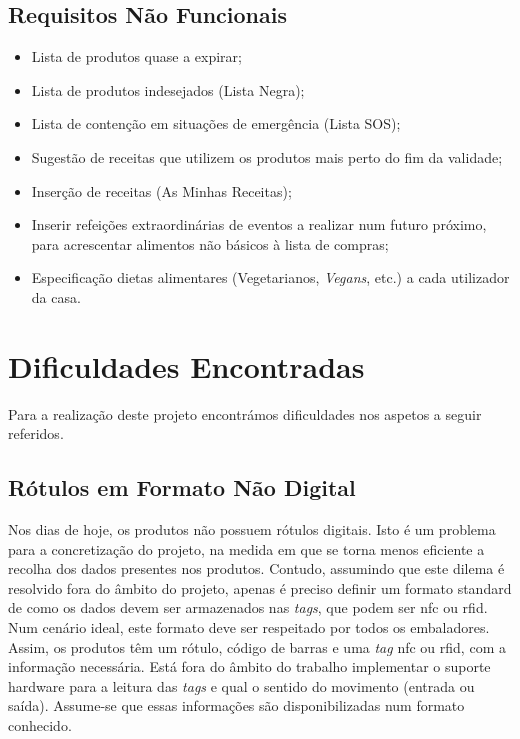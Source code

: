 \subsection{Requisitos Não Funcionais}
\begin{itemize}
	\item Lista de produtos quase a expirar;
	\item Lista de produtos indesejados (Lista Negra);
	\item Lista de contenção em situações de emergência (Lista SOS);
	\item Sugestão de receitas que utilizem os produtos mais perto do fim da validade;
	\item Inserção de receitas (As Minhas Receitas);
	\item Inserir refeições extraordinárias de eventos a realizar num futuro próximo, para acrescentar alimentos não básicos à lista de compras;
	\item Especificação dietas alimentares (Vegetarianos, \textit{Vegans}, etc.) a cada utilizador da casa.
\end{itemize}


%
%
\section{Dificuldades Encontradas} \label{sec23}

Para a realização deste projeto encontrámos dificuldades nos aspetos a seguir referidos.

\subsection{Rótulos em Formato Não Digital}

Nos dias de hoje, os produtos não possuem rótulos digitais. Isto é um problema para a concretização do projeto, na medida em que se torna menos eficiente a recolha dos dados presentes nos produtos. Contudo, assumindo que este dilema é resolvido fora do âmbito do projeto, apenas é preciso definir um formato standard de como os dados devem ser armazenados nas \textit{tags}, que podem ser \acrshort{nfc} ou \acrshort{rfid}. Num cenário ideal, este formato deve ser respeitado por todos os embaladores. Assim, os produtos têm um rótulo, código de barras e uma \textit{tag} \acrshort{nfc} ou \acrshort{rfid}, com a informação necessária. Está fora do âmbito do trabalho implementar o suporte hardware para a leitura das \textit{tags} e qual o sentido do movimento (entrada ou saída). Assume-se que essas informações são disponibilizadas num formato conhecido. 


